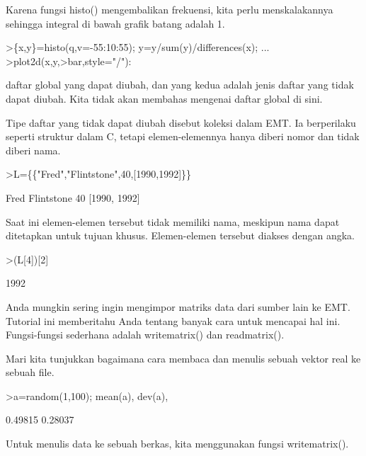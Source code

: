 \documentclass{article}
\begin{document}
\begin{eulernotebook}
\begin{eulercomment}
Karena fungsi histo() mengembalikan frekuensi, kita perlu
menskalakannya sehingga integral di bawah grafik batang adalah 1.
\end{eulercomment}
\begin{eulerprompt}
>\{x,y\}=histo(q,v=-55:10:55); y=y/sum(y)/differences(x); ...
>plot2d(x,y,>bar,style="/"):
\end{eulerprompt}
\begin{eulercomment}
daftar global yang dapat diubah, dan yang kedua adalah jenis daftar
yang tidak dapat diubah. Kita tidak akan membahas mengenai daftar
global di sini.

Tipe daftar yang tidak dapat diubah disebut koleksi dalam EMT. Ia
berperilaku seperti struktur dalam C, tetapi elemen-elemennya hanya
diberi nomor dan tidak diberi nama.
\end{eulercomment}
\begin{eulerprompt}
>L=\{\{"Fred","Flintstone",40,[1990,1992]\}\}
\end{eulerprompt}
\begin{euleroutput}
  Fred
  Flintstone
  40
  [1990,  1992]
\end{euleroutput}
\begin{eulercomment}
Saat ini elemen-elemen tersebut tidak memiliki nama, meskipun nama
dapat ditetapkan untuk tujuan khusus. Elemen-elemen tersebut diakses
dengan angka.
\end{eulercomment}
\begin{eulerprompt}
>(L[4])[2]
\end{eulerprompt}
\begin{euleroutput}
  1992
\end{euleroutput}
\begin{eulercomment}
Anda mungkin sering ingin mengimpor matriks data dari sumber lain ke
EMT. Tutorial ini memberitahu Anda tentang banyak cara untuk mencapai
hal ini. Fungsi-fungsi sederhana adalah writematrix() dan
readmatrix().

Mari kita tunjukkan bagaimana cara membaca dan menulis sebuah vektor
real ke sebuah file.
\end{eulercomment}
\begin{eulerprompt}
>a=random(1,100); mean(a), dev(a),
\end{eulerprompt}
\begin{euleroutput}
  0.49815
  0.28037
\end{euleroutput}
\begin{eulercomment}
Untuk menulis data ke sebuah berkas, kita menggunakan fungsi
writematrix().


\end{eulercomment}
\end{eulernotebook}
\end{document}
